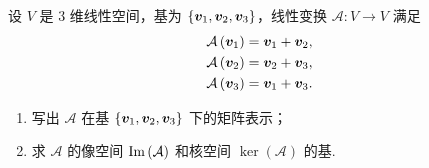 设 $V$ 是 3 维线性空间，基为 $\left\{\boldsymbol{v}_1, \boldsymbol{v}_2, \boldsymbol{v}_3\right\}$，线性变换 $\mathcal{A}: V \to V$ 满足
\[
\begin{aligned}
    \mathcal{A} \left(\boldsymbol{v}_1\right) = \boldsymbol{v}_1 + \boldsymbol{v}_2, \\
    \mathcal{A} \left(\boldsymbol{v}_2\right) = \boldsymbol{v}_2 + \boldsymbol{v}_3, \\
    \mathcal{A} \left(\boldsymbol{v}_3\right) = \boldsymbol{v}_1 + \boldsymbol{v}_3. \\
\end{aligned}
\]
\begin{enumerate}
    \item 写出 $\mathcal{A}$ 在基 $\left\{\boldsymbol{v}_1, \boldsymbol{v}_2, \boldsymbol{v}_3\right\}$ 下的矩阵表示；
    \item 求 $\mathcal{A}$ 的像空间 $\mathrm{Im} \left(\mathcal{A}\right)$ 和核空间 $\ker \left(\mathcal{A}\right)$ 的基.
\end{enumerate}

